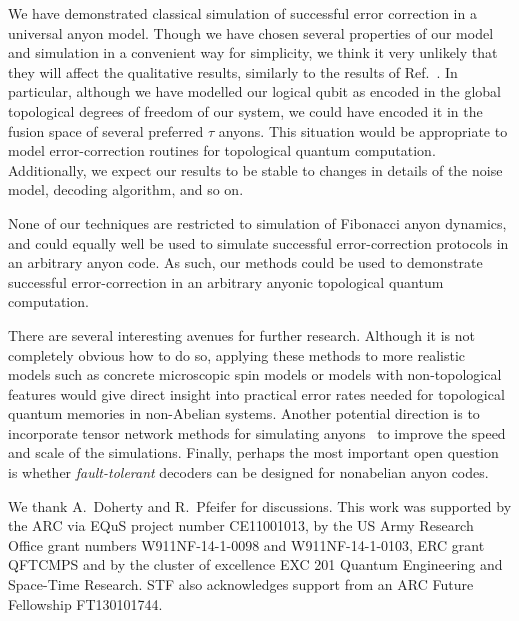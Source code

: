 \documentclass[aps, prl, letterpaper, twocolumn, superscriptaddress, notitlepage, 10pt]{revtex4-1}
\begin{document}
We have demonstrated classical simulation of successful error correction in a universal anyon 
model. Though we have chosen several properties of our model and simulation in a 
convenient way for simplicity, we think it very unlikely that they will affect the qualitative 
results, similarly to the results of Ref.~\cite{Brell2013}. In particular, although we have 
modelled our logical qubit as encoded in the global topological degrees of freedom of our 
system, we could have encoded it in the fusion space of several preferred $\tau$ anyons. 
This situation would be appropriate to model error-correction routines for topological 
quantum computation. Additionally, we expect our results to be stable to changes 
in details of the noise model, decoding algorithm, and so on.

None of our techniques are restricted to simulation of Fibonacci anyon dynamics, and could 
equally well be used to simulate successful error-correction protocols in an arbitrary anyon 
code. 
As such, our methods could be used to demonstrate successful error-correction in an arbitrary anyonic topological quantum computation.

There are several interesting avenues for further research. 
Although it is not completely obvious how to do so, applying these methods to more realistic models such as concrete microscopic spin models or models with non-topological features would give direct insight into practical error rates needed for topological quantum memories in non-Abelian systems. 
Another potential direction is to incorporate tensor network methods for simulating anyons~\cite{Pfeifer2012, Singh2014} to improve the speed and scale of the simulations. 
Finally, perhaps the most important open question is whether \emph{fault-tolerant} decoders can be designed for nonabelian anyon codes. 


\acknowledgments 

We thank A.\ Doherty and R.\ Pfeifer for discussions. 
This work was supported by the ARC via EQuS project number CE11001013, by the US Army Research Office grant numbers W911NF-14-1-0098 and W911NF-14-1-0103, ERC grant QFTCMPS and by the cluster of excellence EXC 201 Quantum Engineering and Space-Time Research. STF also acknowledges support from an ARC Future Fellowship FT130101744.


\end{document}
